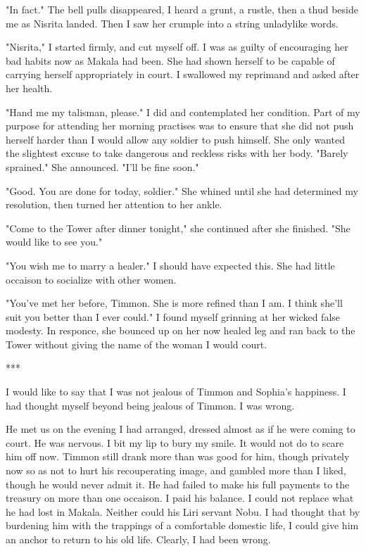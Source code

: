 \documentclass{article}
\begin{document}
"In fact." The bell pulls disappeared, I heard a grunt, a rustle, then a thud beside me as Nisrita landed. Then I saw her crumple into a string unladylike words. 

"Nisrita," I started firmly, and cut myself off. I was as guilty of encouraging her bad habits now as Makala had been. She had shown herself to be capable of carrying herself appropriately in court. I swallowed my reprimand and asked after her health.

"Hand me my talisman, please." I did and contemplated her condition. Part of my purpose for attending her morning practises was to ensure that she did not push herself harder than I would allow any soldier to push himself. She only wanted the slightest excuse to take dangerous and reckless risks with her body. "Barely sprained." She announced. "I'll be fine soon."

"Good. You are done for today, soldier." She whined until she had determined my resolution, then turned her attention to her ankle. 

"Come to the Tower after dinner tonight," she continued after she finished. "She would like to see you."

"You wish me to marry a healer." I should have expected this. She had little occaison to socialize with other women. 

"You've met her before, Timmon. She is more refined than I am. I think she'll suit you better than I ever could." I found myself grinning at her wicked false modesty. In responce, she bounced up on her now healed leg and ran back to the Tower without giving the name of the woman I would court.

***

I would like to say that I was not jealous of Timmon and Sophia's happiness. I had thought myself beyond being jealous of Timmon. I was wrong. 

He met us on the evening I had arranged, dressed almost as if he were coming to court. He was nervous. I bit my lip to bury my smile. It would not do to scare him off now. Timmon still drank more than was good for him, though privately now so as not to hurt his recouperating image, and gambled more than I liked, though he would never admit it. He had failed to make his full payments to the treasury on more than one occaison. I paid his balance. I could not replace what he had lost in Makala. Neither could his Liri servant Nobu. I had thought that by burdening him with the trappings of a comfortable domestic life, I could give him an anchor to return to his old life. Clearly, I had been wrong. 
\end{document}
